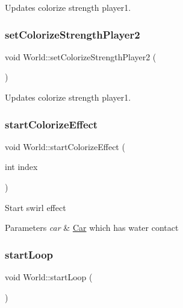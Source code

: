Updates colorize strength player1. 

\mbox{\label{class_world_aef2a19f30cc4445ea4d49dd5b2db6d78}} 
\subsubsection{\texorpdfstring{setColorizeStrengthPlayer2}{setColorizeStrengthPlayer2}}
{\footnotesize\ttfamily void World\+::set\+Colorize\+Strength\+Player2 (\begin{DoxyParamCaption}{ }\end{DoxyParamCaption})\hspace{0.3cm}{\ttfamily [slot]}}



Updates colorize strength player1. 

\mbox{\label{class_world_adff73761217839dc0bfa3df65cfea801}} 
\subsubsection{\texorpdfstring{startColorizeEffect}{startColorizeEffect}}
{\footnotesize\ttfamily void World\+::start\+Colorize\+Effect (\begin{DoxyParamCaption}\item[{int}]{index }\end{DoxyParamCaption})\hspace{0.3cm}{\ttfamily [slot]}}

Start swirl effect 
\begin{DoxyParams}{Parameters}
{\em car} & \mbox{\hyperlink{class_car}{Car}} which has water contact \\
\hline
\end{DoxyParams}
\mbox{\label{class_world_a7ddcac8a4f5c94a846476b2832878f26}} 
\subsubsection{\texorpdfstring{startLoop}{startLoop}}
{\footnotesize\ttfamily void World\+::start\+Loop (\begin{DoxyParamCaption}{ }\end{DoxyParamCaption})\hspace{0.3cm}{\ttfamily [slot]}}



